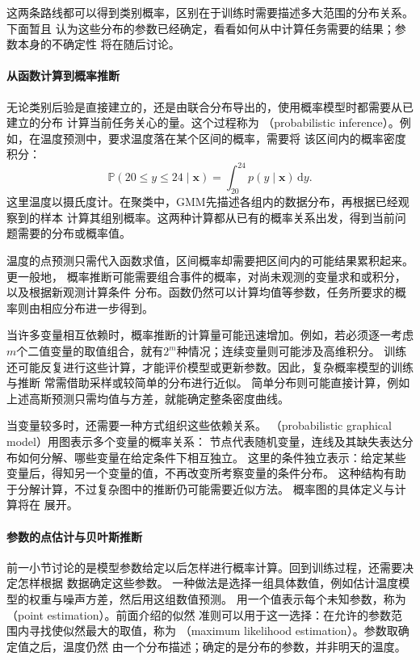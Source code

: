 这两条路线都可以得到类别概率，区别在于训练时需要描述多大范围的分布关系。下面暂且
认为这些分布的参数已经确定，看看如何从中计算任务需要的结果；参数本身的不确定性
将在随后讨论。

\paragraph{从函数计算到概率推断}

无论类别后验是直接建立的，还是由联合分布导出的，使用概率模型时都需要从已建立的分布
计算当前任务关心的量。这个过程称为
（probabilistic inference）。例如，在温度预测中，要求温度落在某个区间的概率，需要将
该区间内的概率密度积分：
\begin{equation}
  \mathbb{P}(20\leq y\leq24\mid\bm{x})
  =\int_{20}^{24}p(y\mid\bm{x})\,\mathrm{d}y.
  \label{eq:models-predictive-interval}
\end{equation}
这里温度以摄氏度计。在聚类中，GMM先描述各组内的数据分布，再根据已经观察到的样本
计算其组别概率。这两种计算都从已有的概率关系出发，得到当前问题需要的分布或概率值。

温度的点预测只需代入函数求值，区间概率却需要把区间内的可能结果累积起来。更一般地，
概率推断可能需要组合事件的概率，对尚未观测的变量求和或积分，以及根据新观测计算条件
分布。函数仍然可以计算均值等参数，任务所要求的概率则由相应分布进一步得到。

当许多变量相互依赖时，概率推断的计算量可能迅速增加。例如，若必须逐一考虑
$m$个二值变量的取值组合，就有$2^m$种情况；连续变量则可能涉及高维积分。
训练还可能反复进行这些计算，才能评价模型或更新参数。因此，复杂概率模型的训练与推断
常需借助采样或较简单的分布进行近似。
简单分布则可能直接计算，例如上述高斯预测只需均值与方差，就能确定整条密度曲线。

当变量较多时，还需要一种方式组织这些依赖关系。
（probabilistic graphical model）用图表示多个变量的概率关系：
节点代表随机变量，连线及其缺失表达分布如何分解、哪些变量在给定条件下相互独立。
这里的条件独立表示：给定某些变量后，得知另一个变量的值，不再改变所考察变量的条件分布。
这种结构有助于分解计算，不过复杂图中的推断仍可能需要近似方法。
概率图的具体定义与计算将在
展开。

\paragraph{参数的点估计与贝叶斯推断}

前一小节讨论的是模型参数给定以后怎样进行概率计算。回到训练过程，还需要决定怎样根据
数据确定这些参数。
一种做法是选择一组具体数值，例如估计温度模型的权重与噪声方差，然后用这组数值预测。
用一个值表示每个未知参数，称为（point estimation）。前面介绍的似然
准则可以用于这一选择：在允许的参数范围内寻找使似然最大的取值，称为
（maximum likelihood estimation）。参数取确定值之后，温度仍然
由一个分布描述；确定的是分布的参数，并非明天的温度。

